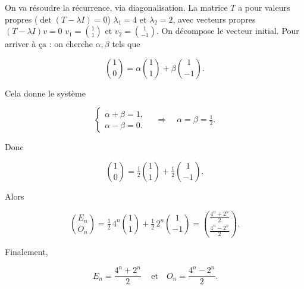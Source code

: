 \begin{solution}
On va résoudre la récurrence, via diagonalisation. La matrice $T$ a pour valeurs propres ($\det(T - \lambda I) = 0$) $\lambda_1=4$ et $\lambda_2=2$, avec vecteurs propres $(T - \lambda I) v = 0$
$v_1=\binom{1}{1}$ et $v_2=\binom{1}{-1}$.
On décompose le vecteur initial. Pour arriver à ça : on cherche $\alpha,\beta$ tels que

$$
\binom10=\alpha\binom11+\beta\binom1{-1}.
$$

Cela donne le système

$$
\begin{cases}
\alpha+\beta=1,\\
\alpha-\beta=0.
\end{cases}
\quad\Longrightarrow\quad
\alpha=\beta=\tfrac12.
$$

Donc

$$
\binom10=\tfrac12\binom11+\tfrac12\binom1{-1}.
$$

Alors

$$
\binom{E_n}{O_n}
= \tfrac12\,4^n\binom{1}{1}+\tfrac12\,2^n\binom{1}{-1}
= \binom{\tfrac{4^n+2^n}{2}}{\tfrac{4^n-2^n}{2}}.
$$

Finalement, 

$$
\boxed{\,E_n=\frac{4^n+2^n}{2}\,}
\quad\text{et}\quad
O_n=\frac{4^n-2^n}{2}.
$$

\end{solution}

